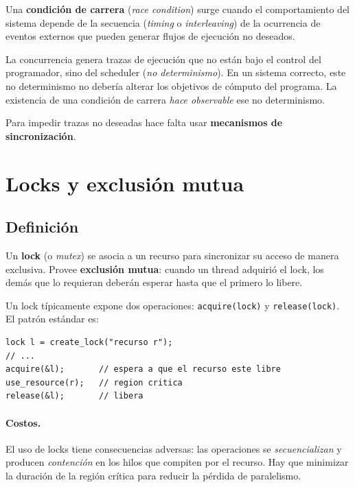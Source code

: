 \documentclass[11pt,a4paper]{article}
\begin{document}
\begin{definicion}
Una \textbf{condición de carrera} (\emph{race condition}) surge cuando
el comportamiento del sistema depende de la secuencia (\emph{timing}
o \emph{interleaving}) de la ocurrencia de eventos externos que
pueden generar flujos de ejecución no deseados.
\end{definicion}

\begin{importante}
La concurrencia genera trazas de ejecución que no están bajo el
control del programador, sino del scheduler (\emph{no determinismo}).
En un sistema correcto, este no determinismo no debería alterar los
objetivos de cómputo del programa. La existencia de una condición de
carrera \emph{hace observable} ese no determinismo.
\end{importante}

Para impedir trazas no deseadas hace falta usar \textbf{mecanismos de
sincronización}.

\section{Locks y exclusión mutua}

\subsection{Definición}

\begin{definicion}
Un \textbf{lock} (o \emph{mutex}) se asocia a un recurso para
sincronizar su acceso de manera exclusiva. Provee \textbf{exclusión
mutua}: cuando un thread adquirió el lock, los demás que lo
requieran deberán esperar hasta que el primero lo libere.
\end{definicion}

Un lock típicamente expone dos operaciones: \texttt{acquire(lock)} y
\texttt{release(lock)}. El patrón estándar es:

\begin{lstlisting}[style=cstyle]
lock l = create_lock("recurso r");
// ...
acquire(&l);       // espera a que el recurso este libre
use_resource(r);   // region critica
release(&l);       // libera
\end{lstlisting}

\paragraph{Costos.} El uso de locks tiene consecuencias adversas:
las operaciones se \emph{secuencializan} y producen
\emph{contención} en los hilos que compiten por el recurso. Hay que
minimizar la duración de la región crítica para reducir la pérdida
de paralelismo.
\end{document}
